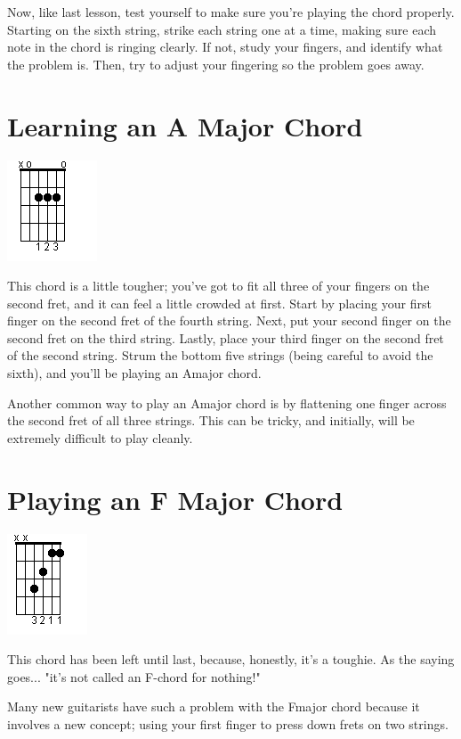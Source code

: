 Now, like last lesson, test yourself to make sure you're playing the chord properly. Starting on the sixth string, strike each string one at a time, making sure each note in the chord is ringing clearly. If not, study your fingers, and identify what the problem is. Then, try to adjust your fingering so the problem goes away.

\section{Learning an A Major Chord}
\includegraphics{partthree/openamajor.png}

This chord is a little tougher; you've got to fit all three of your fingers on the second fret, and it can feel a little crowded at first. Start by placing your first finger on the second fret of the fourth string. Next, put your second finger on the second fret on the third string. Lastly, place your third finger on the second fret of the second string. Strum the bottom five strings (being careful to avoid the sixth), and you'll be playing an Amajor chord.

Another common way to play an Amajor chord is by flattening one finger across the second fret of all three strings. This can be tricky, and initially, will be extremely difficult to play cleanly.

\section{Playing an F Major Chord}
\includegraphics{partthree/openfmajor.png}

This chord has been left until last, because, honestly, it's a toughie. As the saying goes... "it's not called an F-chord for nothing!"

Many new guitarists have such a problem with the Fmajor chord because it involves a new concept; using your first finger to press down frets on two strings.

